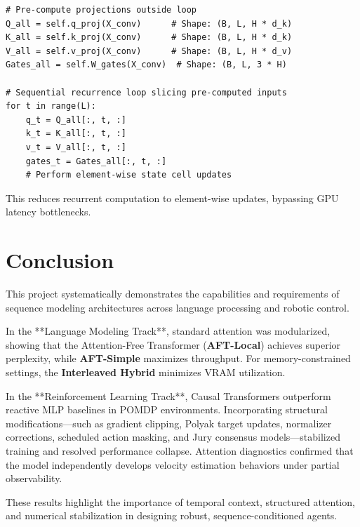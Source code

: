 \documentclass[11pt,a4paper]{article}
\begin{document}
\begin{lstlisting}[caption=xLSTM Projection Offloading Optimization]
# Pre-compute projections outside loop
Q_all = self.q_proj(X_conv)      # Shape: (B, L, H * d_k)
K_all = self.k_proj(X_conv)      # Shape: (B, L, H * d_k)
V_all = self.v_proj(X_conv)      # Shape: (B, L, H * d_v)
Gates_all = self.W_gates(X_conv)  # Shape: (B, L, 3 * H)

# Sequential recurrence loop slicing pre-computed inputs
for t in range(L):
    q_t = Q_all[:, t, :]
    k_t = K_all[:, t, :]
    v_t = V_all[:, t, :]
    gates_t = Gates_all[:, t, :]
    # Perform element-wise state cell updates
\end{lstlisting}
This reduces recurrent computation to element-wise updates, bypassing GPU latency bottlenecks.

\newpage

\section{Conclusion}
This project systematically demonstrates the capabilities and requirements of sequence modeling architectures across language processing and robotic control.

In the **Language Modeling Track**, standard attention was modularized, showing that the Attention-Free Transformer (\textbf{AFT-Local}) achieves superior perplexity, while \textbf{AFT-Simple} maximizes throughput. For memory-constrained settings, the \textbf{Interleaved Hybrid} minimizes VRAM utilization.

In the **Reinforcement Learning Track**, Causal Transformers outperform reactive MLP baselines in POMDP environments. Incorporating structural modifications—such as gradient clipping, Polyak target updates, normalizer corrections, scheduled action masking, and Jury consensus models—stabilized training and resolved performance collapse. Attention diagnostics confirmed that the model independently develops velocity estimation behaviors under partial observability.

These results highlight the importance of temporal context, structured attention, and numerical stabilization in designing robust, sequence-conditioned agents.
\end{document}
